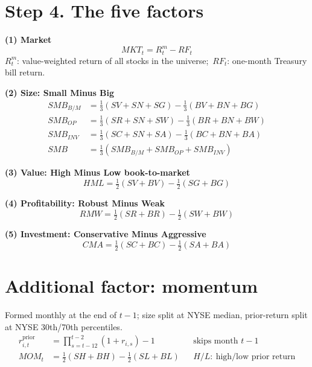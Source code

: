 \documentclass[11pt]{article}
\newcommand{\MKT}{\mathit{MKT}}
\newcommand{\SMB}{\mathit{SMB}}
\newcommand{\HML}{\mathit{HML}}
\newcommand{\RMW}{\mathit{RMW}}
\newcommand{\CMA}{\mathit{CMA}}
\newcommand{\MOM}{\mathit{MOM}}
\newcommand{\RF}{\mathit{RF}}
\begin{document}
\section*{Step 4. The five factors}

\textbf{(1) Market} \cite{ff93}
\begin{equation}
\MKT_t = R^m_t-\RF_t
\end{equation}
$R^m_t$: value-weighted return of all stocks in the universe;\ $\RF_t$: one-month Treasury bill return.

\textbf{(2) Size: Small Minus Big} \cite{ff15}
\begin{align}
\SMB_{B/M} &= \tfrac13(SV+SN+SG)-\tfrac13(BV+BN+BG)\\
\SMB_{OP}  &= \tfrac13(SR+SN+SW)-\tfrac13(BR+BN+BW)\\
\SMB_{INV} &= \tfrac13(SC+SN+SA)-\tfrac13(BC+BN+BA)\\
\SMB &= \tfrac13\left(\SMB_{B/M}+\SMB_{OP}+\SMB_{INV}\right)
\end{align}

\textbf{(3) Value: High Minus Low book-to-market} \cite{ff15}
\begin{equation}
\HML = \tfrac12(SV+BV)-\tfrac12(SG+BG)
\end{equation}

\textbf{(4) Profitability: Robust Minus Weak} \cite{ff15}
\begin{equation}
\RMW = \tfrac12(SR+BR)-\tfrac12(SW+BW)
\end{equation}

\textbf{(5) Investment: Conservative Minus Aggressive} \cite{ff15}
\begin{equation}
\CMA = \tfrac12(SC+BC)-\tfrac12(SA+BA)
\end{equation}

\section*{Additional factor: momentum \normalfont\small\cite{c97,kfmom}}
Formed monthly at the end of $t-1$; size split at NYSE median, prior-return split at NYSE 30th/70th percentiles.
\begin{align}
r^{\text{prior}}_{i,t} &= \prod_{s=t-12}^{t-2}(1+r_{i,s})-1 && \text{skips month } t-1\\
\MOM_t &= \tfrac12(SH+BH)-\tfrac12(SL+BL) && H/L:\ \text{high/low prior return}
\end{align}
\end{document}

